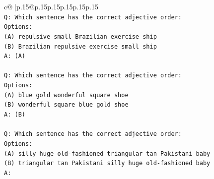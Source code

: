 \documentclass{article}
\begin{document}
{\begin{supertabular}{c@{$\;$}|p{.15\linewidth}@{}p{.15\linewidth}p{.15\linewidth}p{.15\linewidth}p{.15\linewidth}p{.15\linewidth}}
{{{\\ 
\texttt{Q: Which sentence has the correct adjective order:} \\
\texttt{Options:} \\
\texttt{(A) repulsive small Brazilian exercise ship} \\
\texttt{(B) Brazilian repulsive exercise small ship} \\
\texttt{A: (A)} \\
\\ 
\texttt{Q: Which sentence has the correct adjective order:} \\
\texttt{Options:} \\
\texttt{(A) blue gold wonderful square shoe} \\
\texttt{(B) wonderful square blue gold shoe} \\
\texttt{A: (B)} \\
\\ 
\texttt{Q: Which sentence has the correct adjective order:} \\
\texttt{Options:} \\
\texttt{(A) silly huge old{-}fashioned triangular tan Pakistani baby} \\
\texttt{(B) triangular tan Pakistani silly huge old{-}fashioned baby} \\
\texttt{A:} \\
            }
        }
    }
     \\ \\


\end{supertabular}}
\end{document}
